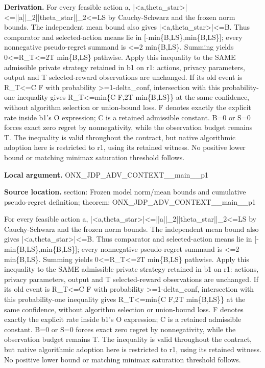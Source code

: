 \documentclass[10pt,a4paper]{article}
\begin{document}
\textbf{Derivation.} For every feasible action a, |<a,theta\_\allowbreak{}star>|<=||a||\_\allowbreak{}2||theta\_\allowbreak{}star||\_\allowbreak{}2<=LS by Cauchy-Schwarz and the frozen norm bounds. The independent mean bound also gives |<a,theta\_\allowbreak{}star>|<=B. Thus comparator and selected-action means lie in [-min\{B,LS\},min\{B,LS\}]; every nonnegative pseudo-regret summand is <=2 min\{B,LS\}. Summing yields 0<=R\_\allowbreak{}T<=2T min\{B,LS\} pathwise. Apply this inequality to the SAME admissible private strategy retained in b1 on r1: actions, privacy parameters, output and T selected-reward observations are unchanged. If its old event is R\_\allowbreak{}T<=C F with probability >=1-delta\_\allowbreak{}conf, intersection with this probability-one inequality gives R\_\allowbreak{}T<=min\{C F,2T min\{B,LS\}\} at the same confidence, without algorithm selection or union-bound loss. F denotes exactly the explicit rate inside b1's O expression; C is a retained admissible constant. B=0 or S=0 forces exact zero regret by nonnegativity, while the observation budget remains T. The inequality is valid throughout the contract, but native algorithmic adoption here is restricted to r1, using its retained witness. No positive lower bound or matching minimax saturation threshold follows.

\textbf{Local argument.} ONX\_\allowbreak{}JDP\_\allowbreak{}ADV\_\allowbreak{}CONTEXT\_\allowbreak{}\_\allowbreak{}main\_\allowbreak{}\_\allowbreak{}p1

\textbf{Source location.}  section: Frozen model norm/mean bounds and cumulative pseudo-regret definition; theorem: ONX\_\allowbreak{}JDP\_\allowbreak{}ADV\_\allowbreak{}CONTEXT\_\allowbreak{}\_\allowbreak{}main\_\allowbreak{}\_\allowbreak{}p1

For every feasible action a, |<a,theta\_\allowbreak{}star>|<=||a||\_\allowbreak{}2||theta\_\allowbreak{}star||\_\allowbreak{}2<=LS by Cauchy-Schwarz and the frozen norm bounds. The independent mean bound also gives |<a,theta\_\allowbreak{}star>|<=B. Thus comparator and selected-action means lie in [-min\{B,LS\},min\{B,LS\}]; every nonnegative pseudo-regret summand is <=2 min\{B,LS\}. Summing yields 0<=R\_\allowbreak{}T<=2T min\{B,LS\} pathwise. Apply this inequality to the SAME admissible private strategy retained in b1 on r1: actions, privacy parameters, output and T selected-reward observations are unchanged. If its old event is R\_\allowbreak{}T<=C F with probability >=1-delta\_\allowbreak{}conf, intersection with this probability-one inequality gives R\_\allowbreak{}T<=min\{C F,2T min\{B,LS\}\} at the same confidence, without algorithm selection or union-bound loss. F denotes exactly the explicit rate inside b1's O expression; C is a retained admissible constant. B=0 or S=0 forces exact zero regret by nonnegativity, while the observation budget remains T. The inequality is valid throughout the contract, but native algorithmic adoption here is restricted to r1, using its retained witness. No positive lower bound or matching minimax saturation threshold follows.
\end{document}
